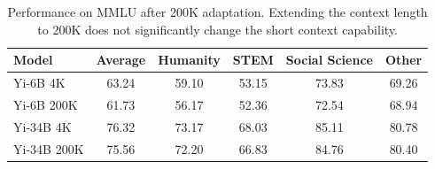 \begin{table}[t!]
  \centering
  \begin{tabular}{@{}lccccc@{}}
\toprule
Model   & \bf Average  & \bf Humanity & \bf STEM  & \bf Social Science & \bf Other \\
\midrule
Yi-6B 4K       & 63.24 & 59.10   & 53.15 & 73.83          & 69.26 \\
Yi-6B 200K     & 61.73 & 56.17   & 52.36 & 72.54          & 68.94 \\
Yi-34B 4K      & 76.32 & 73.17   & 68.03 & 85.11          & 80.78 \\
Yi-34B 200K    & 75.56 & 72.20   & 66.83 & 84.76          & 80.40 \\
\bottomrule

  \end{tabular}
   \caption{Performance on MMLU after 200K adaptation. Extending the context length to 200K does not significantly change the short context capability. 
   }
  \label{tab:long_context_mmlu}
\end{table}
